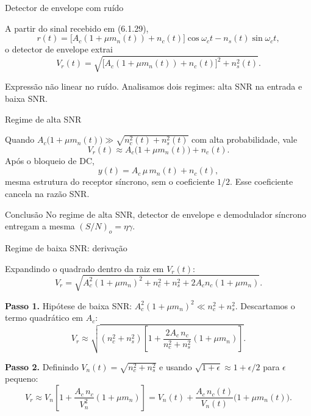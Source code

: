 
\begin{frame}{Detector de envelope com ruído}

A partir do sinal recebido em (6.1.29),
\[
r(t) = \bigl[A_c(1+\mu m_n(t)) + n_c(t)\bigr]\cos\omega_c t - n_s(t)\sin\omega_c t,
\]
o detector de envelope extrai
\[
V_r(t) = \sqrt{\bigl[A_c(1+\mu m_n(t)) + n_c(t)\bigr]^2 + n_s^2(t)}.
\]

\vspace{0.2cm}

Expressão não linear no ruído. Analisamos dois regimes: alta SNR na entrada e baixa SNR.

\end{frame}


\begin{frame}{Regime de alta SNR}

Quando $A_c\bigl(1 + \mu m_n(t)\bigr) \gg \sqrt{n_c^2(t) + n_s^2(t)}$ com alta probabilidade, vale
\[
V_r(t) \approx A_c\bigl(1 + \mu m_n(t)\bigr) + n_c(t).
\]
Após o bloqueio de DC,
\[
y(t) = A_c\,\mu\, m_n(t) + n_c(t),
\]
mesma estrutura do receptor síncrono, sem o coeficiente $1/2$. Esse coeficiente cancela na razão SNR.

\vspace{0.2cm}

\begin{block}{Conclusão}
No regime de alta SNR, detector de envelope e demodulador síncrono entregam a mesma $(S/N)_o = \eta\gamma$.
\end{block}

\end{frame}


\begin{frame}{Regime de baixa SNR: derivação}

Expandindo o quadrado dentro da raiz em $V_r(t)$:
\[
V_r = \sqrt{A_c^2(1+\mu m_n)^2 + n_c^2 + n_s^2 + 2 A_c n_c (1+\mu m_n)}.
\]

\textbf{Passo 1.} Hipótese de baixa SNR: $A_c^2(1+\mu m_n)^2 \ll n_c^2 + n_s^2$. Descartamos o termo quadrático em $A_c$:
\[
V_r \approx \sqrt{(n_c^2 + n_s^2)\left[1 + \frac{2 A_c\, n_c}{n_c^2 + n_s^2}(1+\mu m_n)\right]}.
\]

\textbf{Passo 2.} Definindo $V_n(t) = \sqrt{n_c^2 + n_s^2}$ e usando $\sqrt{1+\epsilon} \approx 1 + \epsilon/2$ para $\epsilon$ pequeno:
\[
V_r \approx V_n\left[1 + \frac{A_c\, n_c}{V_n^2}(1+\mu m_n)\right] = V_n(t) + \frac{A_c\, n_c(t)}{V_n(t)}\bigl(1 + \mu m_n(t)\bigr).
\]

\end{frame}

